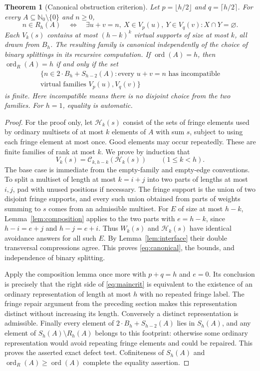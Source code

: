 \documentclass[11pt]{article}
\newtheorem{theorem}{Theorem}[section]
\theoremstyle{remark}\newtheorem{remark}[theorem]{Remark}
\newcommand{\N}{\mathbb N_0}
\newcommand{\ord}{\operatorname{ord}}
\newcommand{\ordR}{\operatorname{ord}_{R}}
\begin{document}
\begin{theorem}[Canonical obstruction criterion]\label{thm:equality}
Let $p=\lfloor h/2\rfloor$ and $q=\lceil h/2\rceil$. For every $A\subseteq\N\setminus\{0\}$ and $n\ge0$,
\begin{equation}\label{eq:maincrit}
 n\in R_h(A)\quad\Longleftrightarrow\quad
 \exists u+v=n,\ X\in V_p(u),\ Y\in V_q(v): X\cap Y=\varnothing.
\end{equation}
Each $V_k(s)$ contains at most $(h-k)^k$ virtual supports of size at most $k$, all drawn from $B_h$. The resulting family is canonical independently of the choice of binary splittings in its recursive computation. If $\ord(A)=h$, then $\ordR(A)=h$ if and only if the set
\begin{multline*}
 \{n\in 2\cdot B_h+S_{h-2}(A):\text{every }u+v=n\text{ has incompatible}\\[-2pt]
 \text{virtual families }V_p(u),V_q(v)\}
\end{multline*}
is finite. Here incompatible means there is no disjoint choice from the two families. For $h=1$, equality is automatic.
\end{theorem}
\begin{proof}
For the proof only, let $\mathcal H_k(s)$ consist of the sets of fringe elements used by ordinary multisets of at most $k$ elements of $A$ with sum $s$, subject to using each fringe element at most once. Good elements may occur repeatedly. These are finite families of rank at most $k$. We prove by induction that
\begin{equation}\label{eq:canonical}
 V_k(s)=\mathcal C_{k,h-k}(\mathcal H_k(s))\qquad(1\le k<h).
\end{equation}
The base case is immediate from the empty-family and empty-edge conventions. To split a multiset of length at most $k=i+j$ into two parts of lengths at most $i,j$, pad with unused positions if necessary. The fringe support is the union of two disjoint fringe supports, and every such union obtained from parts of weights summing to $s$ comes from an admissible multiset. For $E$ of size at most $h-k$, Lemma~\ref{lem:composition} applies to the two parts with $e=h-k$, since $h-i=e+j$ and $h-j=e+i$. Thus $W_k(s)$ and $\mathcal H_k(s)$ have identical avoidance answers for all such $E$. By Lemma~\ref{lem:interface} their double transversal compressions agree. This proves \eqref{eq:canonical}, the bounds, and independence of binary splitting.

Apply the composition lemma once more with $p+q=h$ and $e=0$. Its conclusion is precisely that the right side of \eqref{eq:maincrit} is equivalent to the existence of an ordinary representation of length at most $h$ with no repeated fringe label. The fringe repair argument from the preceding section makes this representation distinct without increasing its length. Conversely a distinct representation is admissible. Finally every element of $2\cdot B_h+S_{h-2}(A)$ lies in $S_h(A)$, and any element of $S_h(A)\setminus R_h(A)$ belongs to this footprint: otherwise some ordinary representation would avoid repeating fringe elements and could be repaired. This proves the asserted exact defect test. Cofiniteness of $S_h(A)$ and $\ordR(A)\ge\ord(A)$ complete the equality assertion.
\end{proof}
\end{document}
